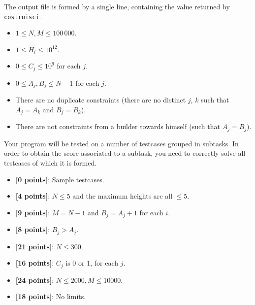 The output file is formed by a single line, containing the value returned by
\texttt{costruisci}.



\Constraints

\begin{itemize}[nolistsep, itemsep=2mm]
	\item $1 \le N, M \le 100\,000$.
	\item $1 \le H_i \le 10^{12}$.
	\item $0 \leq C_j \le 10^9$ for each $j$.
	\item $0 \leq A_j, B_j \leq N - 1$ for each $j$.
	\item There are no duplicate constraints (there are no distinct $j$, $k$ such
	      that $A_j = A_k$ and $B_j = B_k$).
	\item There are not constraints from a builder towards himself (such that $A_j
	      = B_j$).
\end{itemize}



\Scoring

Your program will be tested on a number of testcases grouped in subtasks. In
order to obtain the score associated to a subtask, you need to correctly solve
all testcases of which it is formed.

\begin{itemize}[nolistsep,itemsep=2mm]
  \item \textbf{ [\phantom{1}0 points]}: Sample testcases.
  \item \textbf{ [\phantom{1}4 points]}: $N \leq 5$ and the maximum heights are all $\leq 5$.
  \item \textbf{ [\phantom{1}9 points]}: $M = N - 1$ and $B_j = A_j + 1$ for each $i$.
  \item \textbf{ [\phantom{1}8 points]}: $B_j > A_j$.
  \item \textbf{ [21 points]}: $N \leq 300$.
  \item \textbf{ [16 points]}: $C_j$ is $0$ or $1$, for each $j$.
  \item \textbf{ [24 points]}: $N \leq 2000, M \leq 10000$.
  \item \textbf{ [18 points]}: No limits.
\end{itemize}

